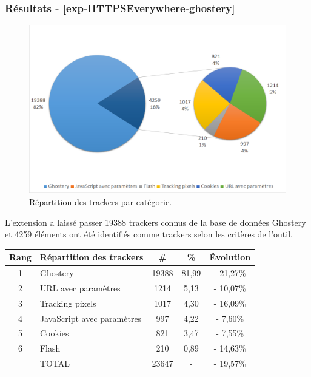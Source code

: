 \subsubsection{Résultats - \autoref{exp-HTTPSEverywhere-ghostery}}
\begin{figure}[!h]
	\centering
	\includegraphics[scale=.6]{resultats/ANALYSES/Images/HTTPSEverywhere-Ghostery.png}
	\caption{\label{exp-HTTPSEverywhere-ghostery}Répartition des trackers par catégorie.}
\end{figure}

L'extension a laissé passer 19388 trackers connus de la base de données Ghostery et 4259 éléments ont été identifiés comme trackers selon les critères de l'outil.\\

\begin{tabular}{ c | p{5cm} | c | c || c | }
   Rang & Répartition des trackers & \# & \% & Évolution \\
   \hline
   \hline
   1 & Ghostery & 19388 & 81,99 & - 21,27\% \\
   2 & URL avec paramètres & 1214 & 5,13 & - 10,07\% \\
   3 & Tracking pixels & 1017 & 4,30 & - 16,09\% \\
   4 & JavaScript avec paramètres & 997 & 4,22 & - 7,60\% \\
   5 & Cookies & 821 & 3,47 & - 7,55\% \\
   6 & Flash & 210 & 0,89 & - 14,63\% \\
   \hline
    & TOTAL & 23647 & - & - 19,57\%\\
   \hline
\end{tabular}
\\[1cm]

